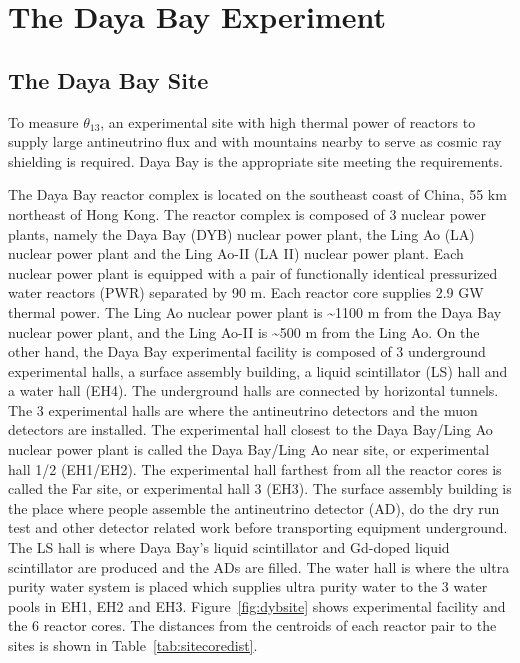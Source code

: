 \chapter{The Daya Bay Experiment}

\section{The Daya Bay Site}
To measure $\theta_{13}$, an experimental site with high thermal power of reactors to supply large antineutrino flux and with mountains nearby to serve as cosmic ray shielding is required. Daya Bay is the appropriate site meeting the requirements.

The Daya Bay reactor complex is located on the southeast coast of China, 55 km northeast of Hong Kong. The reactor complex is composed of 3 nuclear power plants, namely the Daya Bay (DYB) nuclear power plant, the Ling Ao (LA) nuclear power plant and the Ling Ao-II (LA II) nuclear power plant. Each nuclear power plant is equipped with a pair of functionally identical pressurized water reactors (PWR) separated by 90 m. Each reactor core supplies 2.9 GW thermal power. The Ling Ao nuclear power plant is \textasciitilde 1100 m from the Daya Bay nuclear power plant, and the Ling Ao-II is \textasciitilde 500 m from the Ling Ao. On the other hand, the Daya Bay experimental facility is composed of 3 underground experimental halls, a surface assembly building, a liquid scintillator (LS) hall and a water hall (EH4). The underground halls are connected by horizontal tunnels. The 3 experimental halls are where the antineutrino detectors and the muon detectors are installed. The experimental hall closest to the Daya Bay/Ling Ao nuclear power plant is called the Daya Bay/Ling Ao near site, or experimental hall 1/2 (EH1/EH2). The experimental hall farthest from all the reactor cores is called the Far site, or experimental hall 3 (EH3). The surface assembly building is the place where people assemble the antineutrino detector (AD), do the dry run test and other detector related work before transporting equipment underground. The LS hall is where Daya Bay's liquid scintillator and Gd-doped liquid scintillator are produced and the ADs are filled. The water hall is where the ultra purity water system is placed which supplies ultra purity water to the 3 water pools in EH1, EH2 and EH3. Figure~\ref{fig:dybsite} shows experimental facility and the 6 reactor cores. The distances from the centroids of each reactor pair to the sites is shown in Table~\ref{tab:sitecoredist}.

